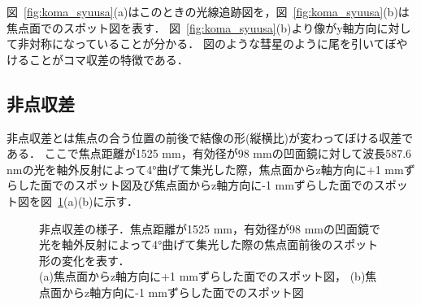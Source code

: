 図\ \ref{fig:koma_syuusa}(a)はこのときの光線追跡図を，図\ \ref{fig:koma_syuusa}(b)は焦点面でのスポット図を表す．
図\ \ref{fig:koma_syuusa}(b)より像がy軸方向に対して非対称になっていることが分かる．
図のような彗星のように尾を引いてぼやけることがコマ収差の特徴である．

\subsection{非点収差}
非点収差とは焦点の合う位置の前後で結像の形(縦横比)が変わってぼける収差である\cite{syuusa}．
ここで焦点距離が1525 mm，有効径が98 mmの凹面鏡に対して波長587.6 nmの光を軸外反射によって4°曲げて集光した際，焦点面からz軸方向に+1 mmずらした面でのスポット図及び焦点面からz軸方向に-1 mmずらした面でのスポット図を図\ \ref{fig:hitensyuusa}(a)(b)に示す．
\begin{figure}
    \caption[非点収差の様子]{非点収差の様子．焦点距離が1525 mm，有効径が98 mmの凹面鏡で光を軸外反射によって4°曲げて集光した際の焦点面前後のスポット形の変化を表す．\\
    (a)焦点面からz軸方向に+1 mmずらした面でのスポット図，
    (b)焦点面からz軸方向に-1 mmずらした面でのスポット図}
    \label{fig:hitensyuusa}
\end{figure}
